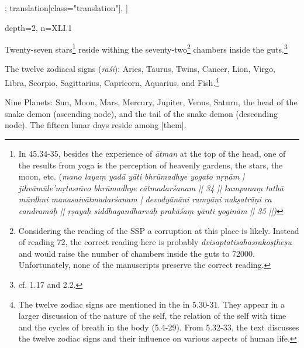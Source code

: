 \begin{alignment}[
  texts=edition[class="edition"];
  translation[class="translation"],
  ]
\begin{translation}
{      depth=2, 
      n=XLI.1
    }
    \label{starstrans}
    \begin{tlate}[p41_01]
\noindent
Twenty-seven stars\footnote{In  45.34-35, besides the experience of \textit{ātman} at the top of the head, one of the results from yoga is the perception of heavenly gardens, the stars, the moon, etc. (\textit{mano layaṃ yadā yāti bhrūmadhye yogato nṛṇām | jihvāmūle'mṛtasrāvo bhrūmadhye cātmadarśanam || 34 || kampanaṃ tathā mūrdhni manasaivātmadarśanam | devodyānāni ramyāṇi nakṣatrāṇi ca candramāḥ || ṛṣayaḥ siddhagandharvāḥ prakāśaṃ yānti yoginām || 35 ||)}} reside withing the seventy-two\footnote{Considering the reading of the SSP a corruption at this place is likely. Instead of reading 72, the correct reading here is probably \textit{dvisaptatisahasrakoṣṭheṣu} and would raise the number of chambers inside the guts to 72000. Unfortunately, none of the manuscripts preserve the correct reading.} chambers inside the guts.\footnote{cf.  1.17 and  2.2.}

The twelve zodiacal signs (\textit{rāśi}): Aries, Taurus, Twins, Cancer, Lion, Virgo, Libra, Scorpio, Sagittarius, Capricorn, Aquarius, and Fish.\footnote{The twelve zodiac signs are mentioned in the  in 5.30-31. They appear in a larger discussion of the nature of the self, the relation of the self with time and the cycles of breath in the body (5.4-29). From 5.32-33, the text discusses the twelve zodiac signs and their influence on various aspects of human life.} 

Nine Planets: Sun, Moon, Mars, Mercury, Jupiter, Venus, Saturn, the head of the snake demon (ascending node), and the tail of the snake demon (descending node). The fifteen lunar days reside among [them].


\end{tlate}
\end{translation}
\end{alignment}
